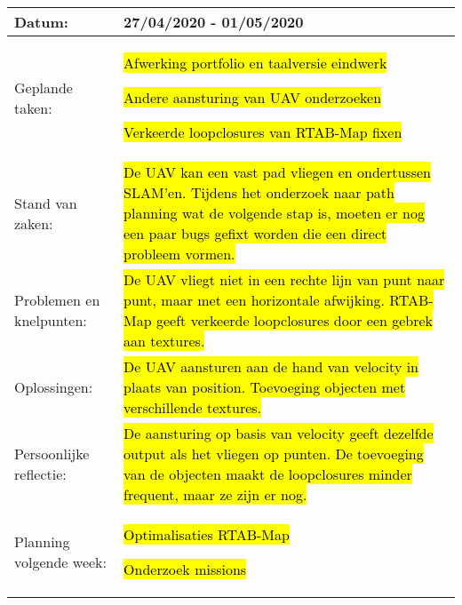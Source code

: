 \begin{tabularx}{\textwidth}{| l | X |}
  \hline
  Datum: & 27/04/2020 - 01/05/2020\\
  \hline
  Geplande taken: &
  \begin{compactitem}
    \item \hl{Afwerking portfolio en taalversie eindwerk}
    \item \hl{Andere aansturing van UAV onderzoeken}
    \item \hl{Verkeerde loopclosures van RTAB-Map fixen}
  \end{compactitem}\\
  \hline
  Stand van zaken: & \hl{De UAV kan een vast pad vliegen en ondertussen SLAM'en. Tijdens het onderzoek naar path planning wat de volgende stap is, moeten er nog een paar bugs gefixt worden die een direct probleem vormen.}\\
  \hline
  Problemen en knelpunten: & \hl{De UAV vliegt niet in een rechte lijn van punt naar punt, maar met een horizontale afwijking. RTAB-Map geeft verkeerde loopclosures door een gebrek aan textures.}\\
  \hline
  Oplossingen: & \hl{De UAV aansturen aan de hand van velocity in plaats van position. Toevoeging objecten met verschillende textures.}\\
  \hline
  Persoonlijke reflectie: & \hl{De aansturing op basis van velocity geeft dezelfde output als het vliegen op punten. De toevoeging van de objecten maakt de loopclosures minder frequent, maar ze zijn er nog.}\\
  \hline
  Planning volgende week: &
  \begin{compactitem}
    \item \hl{Optimalisaties RTAB-Map}
    \item \hl{Onderzoek missions}
  \end{compactitem}\\
  \hline
\end{tabularx}
